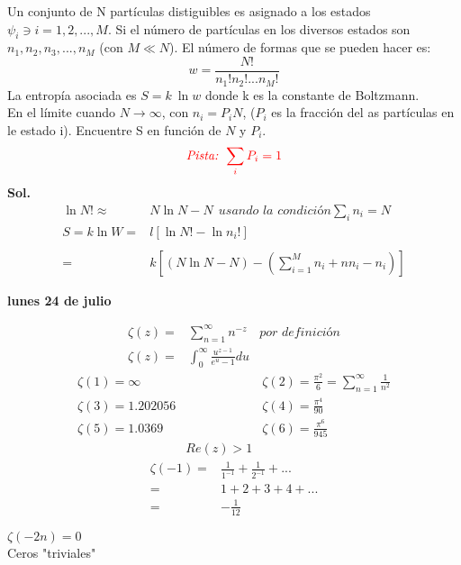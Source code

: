 \documentclass{article}
\theoremstyle{definition}
\begin{document}
Un conjunto de N partículas distiguibles es asignado a los estados $\psi_i\ni i=1,2,...,M$. Si el número de partículas en los diversos estados son $n_1,n_2,n_3,...,n_M$ (con $M\ll N$). El número de formas que se pueden hacer es:
\[w=\frac{N!}{n_1!n_2!...n_M!}\]
La entropía asociada es $S=k\ \ln w$ donde k es la constante de Boltzmann.\\
En el límite cuando $N\to \infty$, con $n_i=P_i N$, ($P_i$ es la fracción del as partículas en le estado i). Encuentre S  en función de $N$ y $P_i$.
\[\textcolor{red}{\textit{Pista: } \sum_iP_i=1}\] 
\textbf{Sol. }
\[
\begin{array}{rl}
	\ln N!\approx & N\ln N-N\ \ \textit{usando la condición} \sum_in_i=N\\
	S=k\ln W=& l \left[\ln N!- \ln n_i!\right]\\
	\\
	=& k\left[ (N\ln N-N)-\left(\sum^M_{i=1}n_i+nn_i-n_i\right)\right]
\end{array}
\]


\newpage
\textbf{lunes 24 de julio}

\[
\begin{array}{rlr}
	\zeta (z) =& \sum^{\infty}_{n=1} n^{-z} & \textit{por definición}\\
	\zeta (z) =& \int^{\infty}_{0}\frac{u^{z-1}}{e^u-1}du
\end{array}
\]
\[
\begin{array}{lcl}
	\zeta (1)=\infty && \zeta (2) =\frac{\pi^2}{6}=\sum^{\infty}_{n=1}\frac{1}{n^2}\\
	\zeta (3) = 1.202056 && \zeta (4)=\frac{\pi^4}{90}\\
	\zeta (5) = 1.0369 &&  \zeta (6) = \frac{\pi^6}{945}\\
	&Re(z)>1
\end{array}
\]
\hfill
\[
\begin{array}{rl}
	\zeta (-1)=& \frac{1}{1^{-1}}+\frac{1}{2^{-1}}+...\\
	=& 1+2+3+4+...\\
	=&-\frac{1}{12}
\end{array}
\]
\begin{center}
	$\zeta(-2n)=0$\\
	Ceros "triviales"
\end{center}
\end{document}
